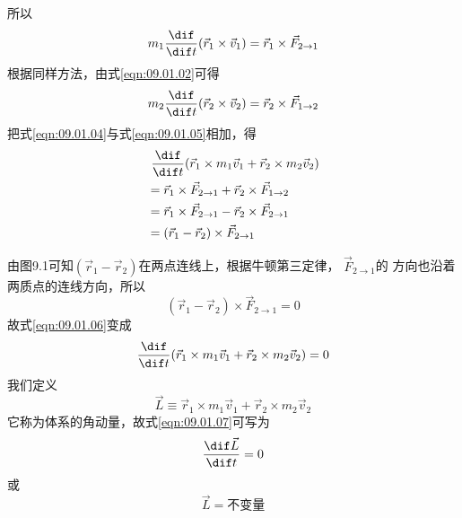 \documentclass[../outline-of-mechanics.tex]{subfiles}
\begin{document}
所以
\begin{equation}\label{eqn:09.01.04}
  m _{ 1 } \frac { \dif }{\dif t } ( \vec{r} _ { 1 } \times \vec{v} _ { 1 } ) = \vec{r} _ { 1 } \times \vec{F} _ { 2 \to 1 }
\end{equation}
根据同样方法，由式\eqref{eqn:09.01.02}可得
\begin{equation}\label{eqn:09.01.05}
  m _{ 2 } \frac { \dif }{\dif t } ( \vec{r} _ { 2 } \times \vec{v} _ { 2 } ) = \vec{r} _ { 2 } \times \vec{F} _ { 1 \to 2 }
\end{equation}
把式\eqref{eqn:09.01.04}与式\eqref{eqn:09.01.05}相加，得
\begin{equation}\label{eqn:09.01.06}
  \begin{aligned}
     & ~\frac { \dif } { \dif t } ( \vec{r} _ { 1 } \times m _ { 1 } \vec{v} _ { 1 } + \vec{r} _ { 2 } \times m _ { 2 } \vec{v} _ { 2 } ) \\
     & = \vec{r} _ { 1 } \times \vec{F} _ { 2 \to 1 } + \vec{r}_ { 2 } \times \vec{F} _ { 1 \to 2 }                                       \\
     & = \vec{r} _ { 1 } \times \vec{F} _ { 2 \to 1 } - \vec{r}_ { 2 } \times \vec{F} _ { 2 \to 1 }                                       \\
     & = ( \vec{r} _ { 1 } - \vec{r} _ { 2 } ) \times \vec{F} _ { 2 \to 1 }
  \end{aligned}
\end{equation}

由图9.1可知$( \vec{r} _ { 1 } - \vec{r} _ { 2 } )$在两点连线上，根据牛顿第三定律， $\vec{F} _ { 2 \to 1 }$的
方向也沿着两质点的连线方向，所以
\begin{equation*}
  ( \vec{r} _ { 1 } - \vec{r} _ { 2 } ) \times \vec{F} _ { 2 \to 1 } = 0
\end{equation*}
故式\eqref{eqn:09.01.06}变成
\begin{equation}\label{eqn:09.01.07}
  \frac { \dif } { \dif t } ( \vec{r} _ { 1 } \times m _ { 1 } \vec{v} _ { 1 } + \vec{r} _ { 2 } \times m _ { 2 } \vec{v} _ { 2 } ) = 0
\end{equation}
我们定义
\begin{equation}\label{eqn:09.01.08}
  \vec{L} \equiv \vec{r} _ { 1 } \times m _ { 1 } \vec{v} _ { 1 } + \vec{r} _ { 2 } \times m _ { 2 } \vec{v} _ { 2 }
\end{equation}
它称为体系的角动量，故式\eqref{eqn:09.01.07}可写为
\begin{equation*}
  \frac { \dif \vec{L} } { \dif t } = 0
\end{equation*}
或
\begin{equation}\label{eqn:09.01.09}
  \vec{L}=\text{不变量}
\end{equation}
\end{document}

